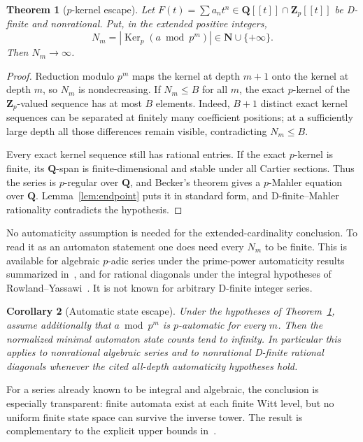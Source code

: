 \documentclass[11pt,reqno]{amsart}
\newtheorem{theorem}{Theorem}[section]
\newtheorem{corollary}[theorem]{Corollary}
\theoremstyle{definition}
\theoremstyle{remark}
\DeclareMathOperator{\Ker}{Ker}
\newcommand{\N}{\mathbf N}
\newcommand{\Q}{\mathbf Q}
\newcommand{\Zp}{\mathbf Z_p}
\begin{document}
\begin{theorem}[$p$-kernel escape]\label{thm:states}
Let $F(t)=\sum a_nt^n\in\Q[[t]]\cap\Zp[[t]]$ be D-finite and nonrational.
Put, in the extended positive integers,
\[
 N_m=|\Ker_p(a\bmod p^m)|\in\N\cup\{+\infty\}.
\]
Then $N_m\to\infty$.
\end{theorem}

\begin{proof}
Reduction modulo $p^m$ maps the kernel at depth $m+1$ onto the kernel at
depth $m$, so $N_m$ is nondecreasing.  If $N_m\leq B$ for all $m$, the exact
$p$-kernel of the $\Zp$-valued sequence has at most $B$ elements.  Indeed,
$B+1$ distinct exact kernel sequences can be separated at finitely many
coefficient positions; at a sufficiently large depth all those differences
remain visible, contradicting $N_m\leq B$.

Every exact kernel sequence still has rational entries.  If the exact
$p$-kernel is finite, its $\Q$-span is finite-dimensional and stable under
all Cartier sections.  Thus the series is $p$-regular over $\Q$, and
Becker's theorem gives a $p$-Mahler equation over $\Q$.
Lemma~\ref{lem:endpoint} puts it in standard form, and
D-finite--Mahler rationality contradicts the hypothesis.
\end{proof}

No automaticity assumption is needed for the extended-cardinality
conclusion.  To read it as an automaton statement one does need every
$N_m$ to be finite.  This is available for algebraic $p$-adic series under
the prime-power automaticity results summarized in~\cite{profinite}, and
for rational diagonals under the integral hypotheses of
Rowland--Yassawi~\cite{diagonals,rowlandyassawi}.  It is not known for
arbitrary D-finite integer series.

\begin{corollary}[Automatic state escape]\label{cor:algebraic}
Under the hypotheses of Theorem~\ref{thm:states}, assume additionally that
$a\bmod p^m$ is $p$-automatic for every $m$.  Then the normalized minimal
automaton state counts tend to infinity.  In particular this applies to
nonrational algebraic series and to nonrational D-finite rational diagonals
whenever the cited all-depth automaticity hypotheses hold.
\end{corollary}

For a series already known to be integral and algebraic, the conclusion is
especially transparent: finite automata exist at each finite Witt level,
but no uniform finite state space can survive the inverse tower.  The result
is complementary to the explicit upper bounds in~\cite{rowlandyassawi}.
\end{document}
